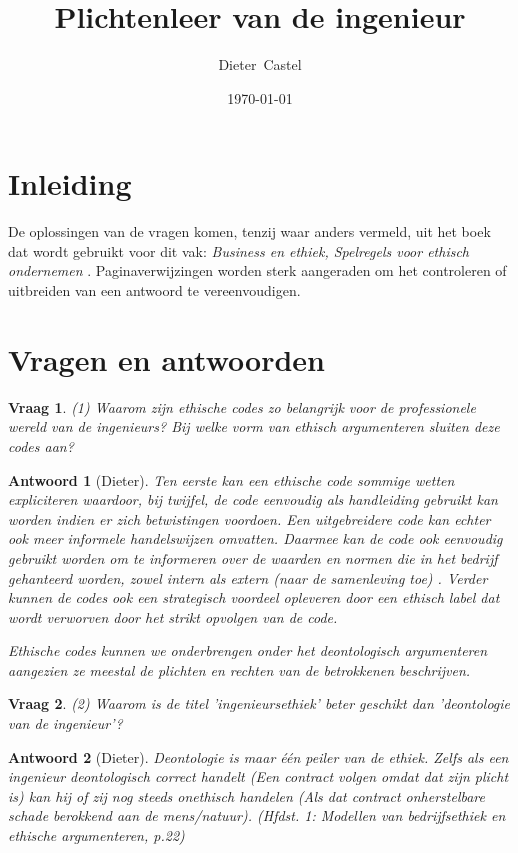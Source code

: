 \documentclass{article}
\title{Plichtenleer van de ingenieur}
\date{\today}
\author{Dieter~Castel}
\theoremstyle{nonumberplain}
\newtheorem{question}{Vraag}
\newtheorem{answer}{Antwoord}
\begin{document}
\maketitle
\tableofcontents
\newpage

\section{Inleiding}
De oplossingen van de vragen komen, tenzij waar anders vermeld, uit het boek dat wordt gebruikt voor dit vak: \textit{Business en ethiek, Spelregels voor ethisch ondernemen} \cite{gerwen2002business}. Paginaverwijzingen worden sterk aangeraden om het controleren of uitbreiden van een antwoord te vereenvoudigen.

\section{Vragen en antwoorden}

\begin{question}
(1)	Waarom zijn ethische codes zo belangrijk voor de professionele wereld van de ingenieurs? Bij welke vorm van ethisch argumenteren sluiten deze codes aan? 
\end{question}
\begin{answer}[Dieter]
	Ten eerste kan een ethische code sommige wetten expliciteren waardoor, bij twijfel, de code eenvoudig als handleiding gebruikt kan worden indien er zich betwistingen voordoen.
	Een uitgebreidere code kan echter ook meer informele handelswijzen omvatten.
	Daarmee kan de code ook eenvoudig gebruikt worden om te informeren over de waarden en normen die in het bedrijf gehanteerd worden, zowel intern als extern (naar de samenleving toe) .
	Verder kunnen de codes ook een strategisch voordeel opleveren door een ethisch label dat wordt verworven door het strikt opvolgen van de code.

	Ethische codes kunnen we onderbrengen onder het deontologisch argumenteren aangezien ze meestal de plichten en rechten van de betrokkenen beschrijven.
\end{answer}

\begin{question}
(2)	Waarom is de titel 'ingenieursethiek' beter geschikt dan 'deontologie van de ingenieur'?
\end{question}
\begin{answer}[Dieter]
	Deontologie is maar \'e\'en peiler van de ethiek. Zelfs als een ingenieur deontologisch correct handelt (Een contract volgen omdat dat zijn plicht is) kan hij of zij nog steeds onethisch handelen (Als dat contract onherstelbare schade berokkend aan de mens/natuur).
	\textit{(Hfdst. 1: Modellen van bedrijfsethiek en ethische argumenteren, p.22)}
\end{answer}
\end{document}
